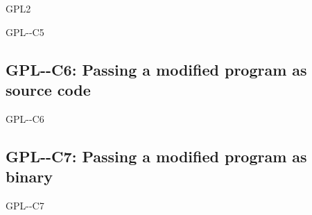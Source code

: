 \begin{license}{GPL2}
\begin{lsuc}{GPL-\ver-C5}
  \useCaseFive

  \begin{lsucrequires}
    \lsucmandatory{\keepLicenseElements}
    \lsucmandatory{\gpltwoEnsureCopyrightNoticeBinary}
    \lsucmandatory{\giveLicense}\passingFilesCorrectly
    \lsucmandatory{\makeAllSourcesAvailable}
    \lsucmandatory{\describeHowToGetSource}
    \lsucmandatory{\addToCopyrightDialogLib}
    \lsucmandatory{\arrangeEnclosingBinaries}
    \lsucmandatory{\retainCopyrightNotices}
    \lsucoptional{\addToDocumentation}
  \end{lsucrequires}

  \lsucprohibitsnothing
\end{lsuc}

\subsection{GPL-\ver-C6: Passing a modified program as source code}
\begin{lsuc}{GPL-\ver-C6}

  \useCaseSix

  \begin{lsucrequires}
    \lsucmandatory{\keepLicenseElements}
    \lsucmandatory{\gpltwoEnsureCopyrightNoticeSource}
    \lsucmandatory{\giveLicense}\passingFilesCorrectly
    \lsucmandatory{\retainCopyrightNotices}
    \lsucmandatory{\addToCopyrightDialogApp}
    \lsucmandatory{\markProgramModifications}
    \lsucmandatory{\arrangeProgramChanges}\howToApplyTheseTerms
    \lsucoptional{\createChangelog}
    \lsucoptional{\addToDocumentation}
  \end{lsucrequires}

  \lsucprohibitsnothing
\end{lsuc}

\subsection{GPL-\ver-C7: Passing a modified program as binary}
\begin{lsuc}{GPL-\ver-C7}

  \useCaseSeven

  \begin{lsucrequires}
    \lsucmandatory{\keepLicenseElements}
    \lsucmandatory{\gpltwoEnsureCopyrightNoticeBinary}
    \lsucmandatory{\giveLicense}\passingFilesCorrectly
    \lsucmandatory{\retainCopyrightNotices}
    \lsucmandatory{\markProgramModifications}
    \lsucmandatory{\addToCopyrightDialogApp}
    \lsucmandatory{\arrangeProgramChanges}\howToApplyTheseTerms
    \lsucmandatory{\makeModifiedSourceAvailable}
    \lsucmandatory{\describeHowToGetSource}
    \lsucoptional{\createChangelog}
    \lsucoptional{\addToDocumentation}
  \end{lsucrequires}


\end{lsuc}
\end{license}
